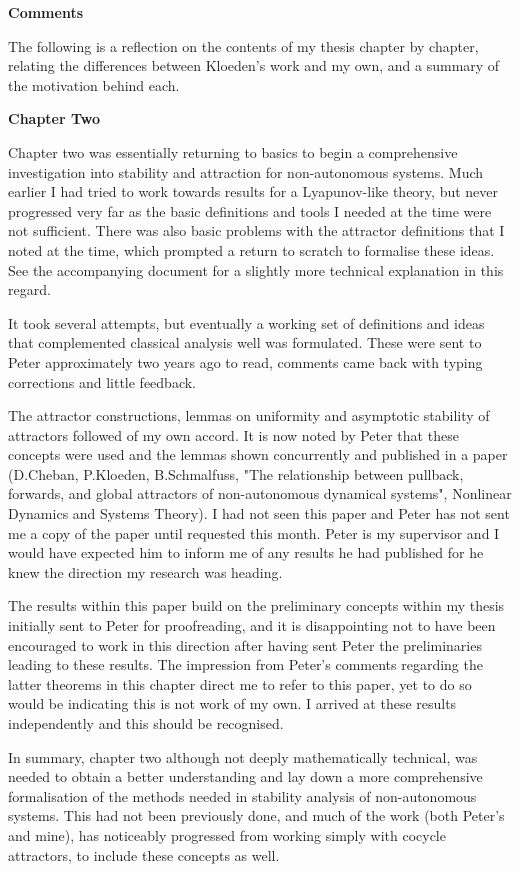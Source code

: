 \documentclass{article}
\begin{document}
\textbf{Comments}

The following is a reflection on the contents of my thesis chapter
by chapter, relating the differences between Kloeden's work and my
own, and a summary of the motivation behind each.

\textbf{Chapter Two}

Chapter two was essentially returning to basics to begin a
comprehensive investigation into stability and attraction for
non-autonomous systems. Much earlier I had tried to work towards
results for a Lyapunov-like theory, but never progressed very far
as the basic definitions and tools I needed at the time were not
sufficient. There was also basic problems with the attractor
definitions that I noted at the time, which prompted a return to
scratch to formalise these ideas. See the accompanying document
for a slightly more technical explanation in this regard.

It took several attempts, but eventually a working set of
definitions and ideas that complemented classical analysis well
was formulated. These were sent to Peter approximately two years
ago to read, comments came back with typing corrections and
little feedback.

The attractor constructions, lemmas on uniformity and asymptotic
stability of attractors followed of my own accord. It is now noted
by Peter that these concepts were used and the lemmas shown
concurrently and published in a paper (D.Cheban, P.Kloeden,
B.Schmalfuss, "The relationship between pullback, forwards, and
global attractors of non-autonomous dynamical systems", Nonlinear
Dynamics and Systems Theory). I had not seen this paper and Peter
has not sent me a copy of the paper until requested this month.
Peter is my supervisor and I would have expected him to inform me
of any results he had published for he knew the direction my
research was heading.

The results within this paper build on the preliminary concepts
within my thesis initially sent to Peter for proofreading, and it
is disappointing not to have been encouraged to work in this
direction after having sent Peter the preliminaries leading to
these results. The impression from Peter's comments regarding the
latter theorems in this chapter direct me to refer to this paper,
yet to do so would be indicating this is not work of my own. I
arrived at these results independently and this should be
recognised.

In summary, chapter two although not deeply mathematically
technical, was needed to obtain a better understanding and lay
down a more comprehensive formalisation of the methods needed in
stability analysis of non-autonomous systems. This had not been
previously done, and much of the work (both Peter's and mine), has
noticeably progressed from working simply with cocycle attractors,
to include these concepts as well.
\end{document}
